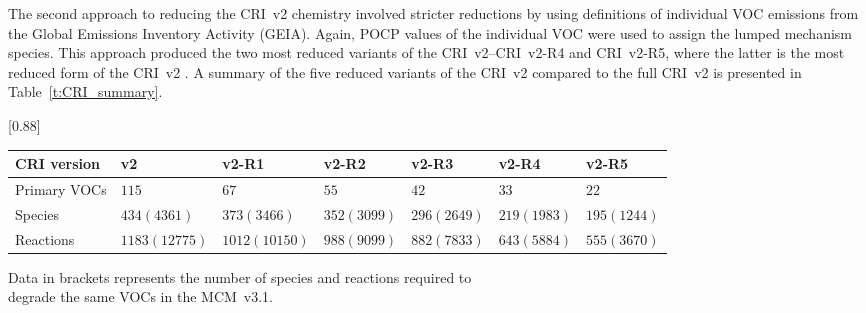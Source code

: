 The second approach to reducing the CRI~v2 chemistry involved stricter reductions by using definitions of individual VOC emissions from the Global Emissions Inventory Activity (GEIA).
Again, POCP values of the individual VOC were used to assign the lumped mechanism species.
This approach produced the two most reduced variants of the CRI~v2--CRI~v2-R4 and CRI~v2-R5, where the latter is the most reduced form of the CRI~v2 \citep{Watson:2008}.
A summary of the five reduced variants of the CRI~v2 compared to the full CRI~v2 is presented in Table~\ref{t:CRI_summary}.

\begin{table*}
    \centering
    \caption[Summary of the CRI~v2 and its five reduced variants.]{Summary of the CRI~v2 and its five reduced variants. Data from Table~1 in \citet{Watson:2008}.}
    \label{t:CRI_summary}
    \begin{threeparttable}
        \centering
        \scalebox{0.88}[0.88]{\begin{tabular}{lllllll}
                \hline \hline
                \textbf{CRI version} & \textbf{v2} & \textbf{v2-R1} & \textbf{v2-R2} & \textbf{v2-R3} & \textbf{v2-R4} & \textbf{v2-R5} \\
                \hline \hline
                Primary VOCs & $115$ & $67$ & $55$ & $42$ & $33$ & $22$ \\
                Species \tnote{a} & $434 (4361)$ & $373 (3466)$ & $352 (3099)$ & $296 (2649)$ & $219 (1983)$ & $195 (1244)$ \\
                Reactions \tnote{a} & $1183 (12775)$ & $1012 (10150)$ & $988 (9099)$ & $882 (7833)$ & $643 (5884)$ & $555 (3670)$ \\
                \hline \hline
            \end{tabular}
        }
        \begin{tablenotes}
            \item[a] Data in brackets represents the number of species and reactions required to\\degrade the same VOCs in the MCM~v3.1.
        \end{tablenotes}
    \end{threeparttable}
\end{table*}

